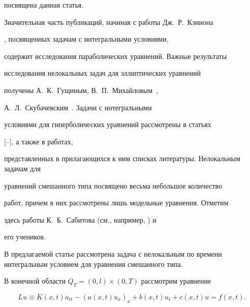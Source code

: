 посвящена данная статья.



Значительная часть публикаций, начиная с работы Дж.~Р.~Кэннона

\cite{kir:cannon}, посвященных задачам с интегральными условиями,

содержит исследования параболических уравнений. Важные результаты

исследования нелокальных задач для эллиптических уравнений

получены А.~К.~Гущиным, В.~П.~Михайловым~\cite{kir:Gu},

А.~Л.~Скубачевским~\cite{kir:skub}. Задачи с интегральными

условиями для гиперболических уравнений рассмотрены в статьях

[--], а также в работах,

представленных в прилагающихся  к ним списках литературы. Нелокальным задачам для

уравнений смешанного типа посвящено весьма небольшое количество

работ, причем в них рассмотрены лишь модельные уравнения. Отметим

здесь работы К.~Б.~Сабитова (см., например, \cite{kir:sabit}) и

его учеников.



В предлагаемой статье рассмотрена задача с нелокальным по времени интегральным условием для уравнения смешанного типа.



\smallskip



 В конечной области $Q_T=(0,l)\times

(0,T)$ рассмотрим уравнение

\begin{equation}

\label{kir:eq1} Lu\equiv

K(x,t)u_{tt}-(a(x,t)u_x)_x+b(x,t)u_t+c(x,t)u=f(x,t).

\end{equation}



\smallskip



